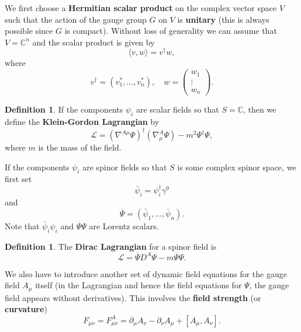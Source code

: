 \documentclass[12pt]{amsart}
\theoremstyle{definition}
\newtheorem{defn}[thm]{Definition}
\theoremstyle{remark}
\numberwithin{equation}{section}
\begin{document}
We first choose a {\bf Hermitian scalar product} on the complex vector space $V$ such that the action of the gauge group $G$ on $V$ is {\bf unitary} (this is always possible since $G$ is compact). Without loss of generality we can assume that $V=\mathbb{C}^n$ and the scalar product is given by
\begin{equation*}
\langle v,w\rangle=v^\dagger w,
\end{equation*}
where
\begin{equation*}
v^\dagger=(v_1^*,\ldots,v_n^*),\quad w=\left(\begin{array}{c}w_1\\ \vdots \\ w_n \end{array}\right).
\end{equation*}
\begin{defn}\label{defn Klein Gordon Lag}
If the components $\psi_i$ are scalar fields so that $S=\mathbb{C}$, then we define the {\bf Klein-Gordon Lagrangian} by
\begin{equation*}
\mathcal{L}=(\nabla^{A\mu}\Psi)^\dagger(\nabla^A_\mu\Psi)-m^2\Psi^\dagger\Psi,
\end{equation*}
where $m$ is the mass of the field.
\end{defn}
If the components $\psi_i$ are spinor fields so that $S$ is some complex spinor space, we first set
\begin{equation*}
\bar{\psi}_i=\psi_i^\dagger\gamma^0
\end{equation*}
and
\begin{equation*}
\overline{\Psi}=(\bar{\psi}_1,\ldots,\bar{\psi}_n).
\end{equation*}
Note that $\bar{\psi}_i\psi_i$ and $\overline{\Psi}\Psi$ are Lorentz scalars. 
\begin{defn}\label{defn Dirac Lag}
The {\bf Dirac Lagrangian} for a spinor field is
\begin{equation*}
\mathcal{L}=\overline{\Psi}D^A\Psi-m\overline{\Psi}{\Psi}.
\end{equation*}
\end{defn}
We also have to introduce another set of dynamic field equations for the gauge field $A_\mu$ itself (in the Lagrangian and hence the field equations for $\Psi$, the gauge field appears without derivatives). This involves the {\bf field strength} (or {\bf curvature})
\begin{equation*}
F_{\mu\nu}=F^A_{\mu\nu}=\partial_\mu A_\nu-\partial_\nu A_\mu+[A_\mu,A_\nu].
\end{equation*} 
\end{document}
